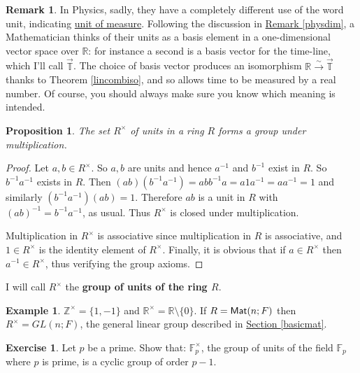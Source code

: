 \documentclass[11pt]{amsbook}
\newtheorem{proposition}[theorem]{Proposition}
\theoremstyle{definition}
\newtheorem{rem}[theorem]{Remark}
\newtheorem{ex}[theorem]{Example}
\newtheorem{exercise}{Exercise}
\begin{document}
\begin{rem} In Physics, sadly, they have a completely different use of the word unit, indicating \href{http://en.wikipedia.org/wiki/SI}{unit of measure}. Following the discussion in \hyperref[physdim]{Remark \ref{physdim}}, a Mathematician thinks of their units as a basis element in a one-dimensional vector space over $\mathbb{R}$: for instance a second is a basis vector for the time-line, which I'll call $\vec{\mathbb{T}}$. The choice of basis vector produces an isomorphism $\mathbb{R} \stackrel{\sim}{\to} \vec{\mathbb{T}}$ thanks to Theorem \ref{lincombiso}, and so allows time to be measured by a real number. Of course, you should always make sure you know which meaning is intended.
\end{rem}

\begin{proposition}
The set $R^{\times}$ of units in a ring $R$ forms a group under multiplication.
\end{proposition}

\begin{proof}
Let $a,b\in R^{\times}$. So $a,b$ are units and hence $a^{-1}$ and $b^{-1}$ exist in $R$. So $b^{-1}a^{-1}$ exists in $R$. Then $(ab)(b^{-1}a^{-1}) = abb^{-1}a = a1a^{-1} = aa^{-1} = 1$ and similarly $(b^{-1}a^{-1})(ab) = 1$. Therefore $ab$ is a unit in $R$ with $(ab)^{-1} = b^{-1}a^{-1}$, as usual. Thus $R^{\times}$ is closed under multiplication.

Multiplication in $R^{\times}$ is associative since multiplication in $R$ is associative, and $1\in R^{\times}$ is the identity element of $R^{\times}$. Finally, it is obvious that if $a\in R^{\times}$ then $a^{-1}\in R^{\times}$, thus verifying the group axioms.
\end{proof}
I will call $R^{\times}$ the {\bf group of units of the ring $R$}.

\begin{ex} $\mathbb{Z}^{\times} = \{ 1, -1\}$ and $\mathbb{R}^{\times} = \mathbb{R}\setminus \{ 0 \}$. If $R = {\sf Mat}(n; F)$ then $R^{\times} = GL(n;F)$, the general linear group described in \hyperref[genlin]{Section \ref{basicmat}}.
\end{ex}

\begin{exercise} \label{DH} Let $p$ be a prime. Show that: $\mathbb{F}_p^{\times}$, the group of units of the field $\mathbb{F}_p$ where $p$ is prime, is a cyclic group of order $p-1$.
\end{exercise}
\end{document}
